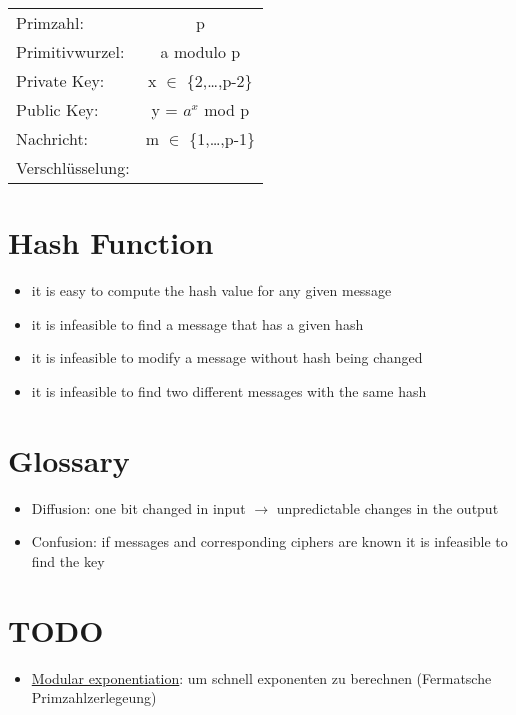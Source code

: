 \documentclass[a4paper]{article}
\begin{document}
\begin{table}[h]
	\centering
	\begin{tabular}{lc}
	Primzahl: & p\\

	Primitivwurzel: & a modulo p \\

	Private Key: & x $\in$ \{2,\dots,p-2\} \\

	Public Key: & y = $a^x$ mod p \\

	Nachricht: & m $\in$ \{1,\dots,p-1\} \\

	Verschlüsselung:


	\end{tabular}
\end{table}

\section{Hash Function}
\begin{itemize}
    \item it is easy to compute the hash value for any given message
    \item it is infeasible to find a message that has a given hash
    \item it is infeasible to modify a message without hash being changed
    \item it is infeasible to find two different messages with the same hash
\end{itemize}

\section{Glossary}
\begin{itemize}
    \item Diffusion: one bit changed in input $\rightarrow$ unpredictable changes in the output
    \item Confusion: if messages and corresponding ciphers are known it is infeasible to find the key
\end{itemize}

\section{TODO}

\begin{itemize}
    \item \href{http://en.wikipedia.org/wiki/Modular_exponentiation}{Modular exponentiation}: um schnell exponenten zu berechnen (Fermatsche Primzahlzerlegeung) 
\end{itemize}
\end{document}
